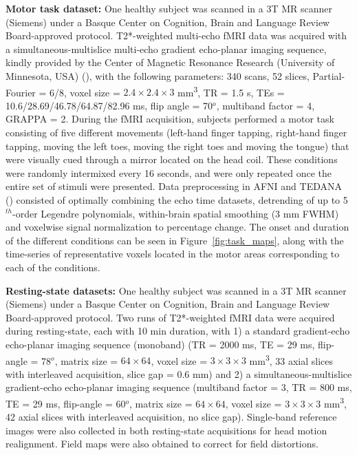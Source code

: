 \textbf{Motor task dataset:} One healthy subject was scanned in a 3T MR scanner (Siemens) under a Basque Center on Cognition, Brain and Language Review Board-approved protocol. T2*-weighted multi-echo fMRI data was acquired with a simultaneous-multislice multi-echo gradient echo-planar imaging sequence, kindly provided by the Center of Magnetic Resonance Research (University of Minnesota, USA) (\citealt{Feinberg_2010,Moeller_2010,Setsompop_2011}), with the following parameters: 340 scans, 52 slices, Partial-Fourier = 6/8, voxel size = $2.4\times2.4\times3$ mm\textsuperscript{3}, TR = 1.5 s, TEs = 10.6/28.69/46.78/64.87/82.96 ms, flip angle = 70\(^o\), multiband factor = 4, GRAPPA = 2. During the fMRI acquisition, subjects performed a motor task consisting of five different movements (left-hand finger tapping, right-hand finger tapping, moving the left toes, moving the right toes and moving the tongue) that were visually cued through a mirror located on the head coil. These conditions were randomly intermixed every 16 seconds, and were only repeated once the entire set of stimuli were presented. Data preprocessing in AFNI and TEDANA (\citealt{tedana}) consisted of optimally combining the echo time datasets, detrending of up to 5\(^{th}\)-order Legendre polynomials, within-brain spatial smoothing (3 mm FWHM) and voxelwise signal normalization to percentage change. The onset and duration of the different conditions can be seen in Figure~\ref{fig:task_maps}, along with the time-series of representative voxels located in the motor areas corresponding to each of the conditions.

\textbf{Resting-state datasets:} One healthy subject was scanned in a 3T MR scanner (Siemens) under a Basque Center on Cognition, Brain and Language Review Board-approved protocol. Two runs of T2*-weighted fMRI data were acquired during resting-state, each with 10 min duration, with 1) a standard gradient-echo echo-planar imaging sequence (monoband) (TR = 2000 ms, TE = 29 ms, flip-angle = 78\(^o\), matrix size = $64\times64$, voxel size = $3\times3\times3$ mm\textsuperscript{3}, 33 axial slices with interleaved acquisition, slice gap = 0.6 mm) and 2) a  simultaneous-multislice gradient-echo echo-planar imaging sequence (multiband factor = 3, TR = 800 ms, TE = 29 ms, flip-angle = 60\(^o\), matrix size = $64\times64$, voxel size = $3\times3\times3$ mm\textsuperscript{3}, 42 axial slices with interleaved acquisition, no slice gap). Single-band reference images were also collected in both resting-state acquisitions for head motion realignment. Field maps were also obtained to correct for field distortions.


